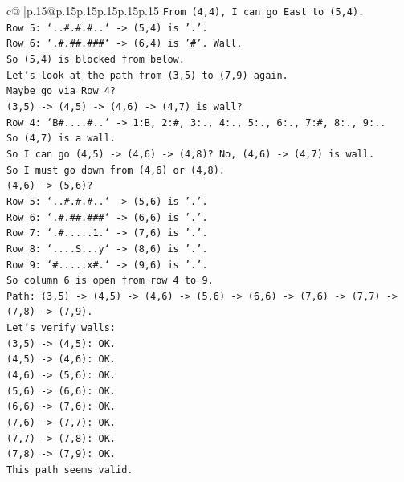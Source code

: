 \documentclass{article}
\begin{document}
{\begin{supertabular}{c@{$\;$}|p{.15\linewidth}@{}p{.15\linewidth}p{.15\linewidth}p{.15\linewidth}p{.15\linewidth}p{.15\linewidth}}
{{{\texttt{From (4,4), I can go East to (5,4).} \\
\texttt{Row 5: `..\#.\#.\#..` {-}> (5,4) is '.'.} \\
\texttt{Row 6: `.\#.\#\#.\#\#\#` {-}> (6,4) is '\#'. Wall.} \\
\texttt{So (5,4) is blocked from below.} \\
\texttt{Let's look at the path from (3,5) to (7,9) again.} \\
\texttt{Maybe go via Row 4?} \\
\texttt{(3,5) {-}> (4,5) {-}> (4,6) {-}> (4,7) is wall?} \\
\texttt{Row 4: `B\#....\#..` {-}> 1:B, 2:\#, 3:., 4:., 5:., 6:., 7:\#, 8:., 9:..} \\
\texttt{So (4,7) is a wall.} \\
\texttt{So I can go (4,5) {-}> (4,6) {-}> (4,8)? No, (4,6) {-}> (4,7) is wall.} \\
\texttt{So I must go down from (4,6) or (4,8).} \\
\texttt{(4,6) {-}> (5,6)?} \\
\texttt{Row 5: `..\#.\#.\#..` {-}> (5,6) is '.'.} \\
\texttt{Row 6: `.\#.\#\#.\#\#\#` {-}> (6,6) is '.'.} \\
\texttt{Row 7: `.\#.....1.` {-}> (7,6) is '.'.} \\
\texttt{Row 8: `....S...y` {-}> (8,6) is '.'.} \\
\texttt{Row 9: `\#.....x\#.` {-}> (9,6) is '.'.} \\
\texttt{So column 6 is open from row 4 to 9.} \\
\texttt{Path: (3,5) {-}> (4,5) {-}> (4,6) {-}> (5,6) {-}> (6,6) {-}> (7,6) {-}> (7,7) {-}> (7,8) {-}> (7,9).} \\
\texttt{Let's verify walls:} \\
\texttt{(3,5) {-}> (4,5): OK.} \\
\texttt{(4,5) {-}> (4,6): OK.} \\
\texttt{(4,6) {-}> (5,6): OK.} \\
\texttt{(5,6) {-}> (6,6): OK.} \\
\texttt{(6,6) {-}> (7,6): OK.} \\
\texttt{(7,6) {-}> (7,7): OK.} \\
\texttt{(7,7) {-}> (7,8): OK.} \\
\texttt{(7,8) {-}> (7,9): OK.} \\
\texttt{This path seems valid.} \\
\\ 
}}}
\end{supertabular}}
\end{document}
